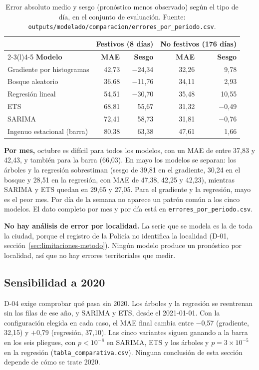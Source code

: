 \begin{table}[H]
\centering
\caption{Error absoluto medio y sesgo (pronóstico menos observado) según el tipo de día, en el conjunto de evaluación. Fuente: \texttt{outputs/\allowbreak{}modelado/\allowbreak{}comparacion/\allowbreak{}errores\_\allowbreak{}por\_\allowbreak{}periodo.csv}.}\label{tab:festivos}
\small
\begin{tabular}{@{}lrrrr@{}}
\toprule
& \multicolumn{2}{c}{\textbf{Festivos (8 días)}} & \multicolumn{2}{c}{\textbf{No festivos (176 días)}} \\
\cmidrule(lr){2-3}\cmidrule(l){4-5}
\textbf{Modelo} & \textbf{MAE} & \textbf{Sesgo} & \textbf{MAE} & \textbf{Sesgo} \\
\midrule
Gradiente por histogramas & 42,73 & $-$24,34 & 32,26 & 9,78 \\
Bosque aleatorio & 36,68 & $-$11,76 & 34,11 & 2,93 \\
Regresión lineal & 54,51 & $-$30,70 & 35,48 & 10,55 \\
ETS & 68,81 & 55,67 & 31,32 & $-$0,49 \\
SARIMA & 72,41 & 58,73 & 31,81 & $-$0,76 \\
\midrule
Ingenuo estacional (barra) & 80,38 & 63,38 & 47,61 & 1,66 \\
\bottomrule
\end{tabular}
\end{table}

\textbf{Por mes,} octubre es difícil para todos los modelos, con un MAE de entre 37,83 y 42,43, y también para la barra (66,03). En mayo los modelos se separan: los árboles y la regresión sobrestiman (sesgo de 39,81 en el gradiente, 30,24 en el bosque y 28,51 en la regresión, con MAE de 47,38, 42,25 y 42,23), mientras SARIMA y ETS quedan en 29,65 y 27,05. Para el gradiente y la regresión, mayo es el peor mes. Por día de la semana no aparece un patrón común a los cinco modelos. El dato completo por mes y por día está en \texttt{errores\_\allowbreak{}por\_\allowbreak{}periodo.csv}.

\textbf{No hay análisis de error por localidad.} La serie que se modela es la de toda la ciudad, porque el registro de la Policía no identifica la localidad (D-01, sección~\ref{sec:limitaciones-metodo}). Ningún modelo produce un pronóstico por localidad, así que no hay errores territoriales que medir.

\subsection{Sensibilidad a 2020}\label{sec:res-sensibilidad}

D-04 exige comprobar qué pasa sin 2020. Los árboles y la regresión se reentrenan sin las filas de ese año, y SARIMA y ETS, desde el 2021-01-01. Con la configuración elegida en cada caso, el MAE final cambia entre $-$0,57 (gradiente, 32,15) y $+$0,79 (regresión, 37,10). Las cinco variantes siguen ganando a la barra en los seis pliegues, con $p < 10^{-8}$ en SARIMA, ETS y los árboles y $p = 3\times10^{-5}$ en la regresión (\texttt{tabla\_\allowbreak{}comparativa.csv}). Ninguna conclusión de esta sección depende de cómo se trate 2020.
